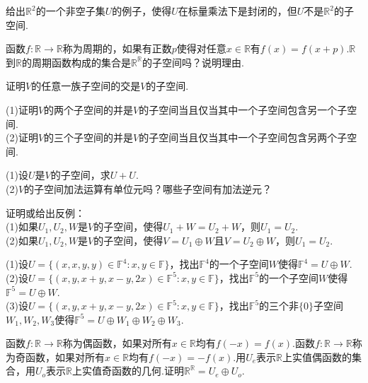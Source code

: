 \documentclass[lang=cn, zihao=5]{elegantbook}
\newcommand{\R}{\mathbb{R}}
\newcommand{\F}{\mathbb{F}}
\begin{document}
\begin{exercise}
	给出$\R ^2$的一个非空子集$U$的例子，使得$U$在标量乘法下是封闭的，但$U$不是$\R ^2$的子空间.
\end{exercise}

\begin{exercise}
	函数$f : \R \to \R$称为周期的，如果有正数$p$使得对任意$x \in \R$有$f(x)=f(x+p)$.$\R$到$\R$的周期函数构成的集合是$\R ^{\R}$的子空间吗？说明理由.
\end{exercise}

\begin{exercise}
	证明$V$的任意一族子空间的交是$V$的子空间.
\end{exercise}

\begin{exercise} %
	(1)证明$V$的两个子空间的并是$V$的子空间当且仅当其中一个子空间包含另一个子空间. \\
	(2)证明$V$的三个子空间的并是$V$的子空间当且仅当其中一个子空间包含另两个子空间.
\end{exercise}

\begin{exercise} %
	(1)设$U$是$V$的子空间，求$U+U$. \\
	(2)$V$的子空间加法运算有单位元吗？哪些子空间有加法逆元？
\end{exercise}

\begin{exercise}
	证明或给出反例： \\
	(1)如果$U_1,U_2,W$是$V$的子空间，使得$U_1+W=U_2+W$，则$U_1=U_2$. \\
	(2)如果$U_1,U_2,W$是$V$的子空间，使得$V=U_1 \oplus W$且$V=U_2 \oplus W$，则$U_1=U_2$.
\end{exercise}

\begin{exercise}
	(1)设$U = \{ (x,x,y,y) \in \F ^{4} : x,y \in \F \}$，找出$\F ^{4}$的一个子空间$W$使得$\F ^{4} = U \oplus W$. \\
	(2)设$U = \{ (x,y,x+y,x-y,2x) \in \F ^{5} : x,y \in \F \}$，找出$\F ^{5}$的一个子空间$W$使得$\F ^{5} = U \oplus W$. \\
	(3)设$U = \{ (x,y,x+y,x-y,2x) \in \F ^{5} : x,y \in \F \}$，找出$\F ^{5}$的三个非$\{ 0 \}$子空间$W_1,W_2,W_3$使得$\F ^{5} = U \oplus W_1 \oplus W_2 \oplus W_3$.
\end{exercise}

\begin{exercise}
	函数$f: \R \to \R$称为偶函数，如果对所有$x \in \R$均有$f(-x) = f(x)$.函数$f: \R \to \R$称为奇函数，如果对所有$x \in \R$均有$f(-x) = -f(x)$.用$U_e$表示$\R$上实值偶函数的集合，用$U_o$表示$\R$上实值奇函数的几何.证明$\R ^{\R} = U_e \oplus U_o$.
\end{exercise}
\end{document}
